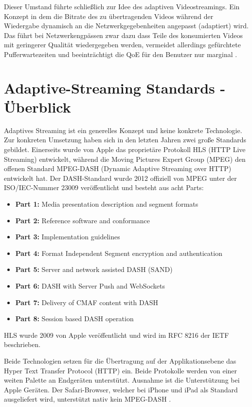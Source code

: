 \documentclass[paper = a4, fontsize = 12pt, parskip = half]{scrartcl} %
\begin{document}
Dieser Umstand führte schließlich zur Idee des adaptiven Videostreamings. Ein Konzept in dem die Bitrate des zu übertragenden Videos während der Wiedergabe dynamisch an die Netzwerkgegebenheiten angepasst (adaptiert) wird. Das führt bei Netzwerkengpässen zwar dazu dass Teile des konsumierten Videos mit geringerer Qualität wiedergegeben werden, vermeidet allerdings gefürchtete Pufferwartezeiten und beeinträchtigt die QoE für den Benutzer nur marginal \cite{seufert_survey_2015}.

\section{Adaptive-Streaming Standards - Überblick}
Adaptives Streaming ist ein generelles Konzept und keine konkrete Technologie. Zur konkreten Umsetzung haben sich in den letzten Jahren zwei große Standards gebildet. Einerseits wurde von Apple das proprietäre Protokoll HLS (HTTP Live Streaming) entwickelt, während die Moving Pictures Expert Group (MPEG) den offenen Standard MPEG-DASH (Dynamic Adaptive Streaming over HTTP) entwickelt hat. Der DASH-Standard wurde 2012 offiziell von MPEG unter der ISO/IEC-Nummer 23009 \cite{international_organization_for_standardization_isoiec_nodate} veröffentlicht und besteht aus acht Parts:

\begin{itemize}
	\item \textbf{Part 1:} Media presentation description and segment formats
	\item \textbf{Part 2:} Reference software and conformance
	\item \textbf{Part 3:} Implementation guidelines
	\item \textbf{Part 4:} Format Independent Segment encryption and authentication
	\item \textbf{Part 5:} Server and network assisted DASH (SAND)
	\item \textbf{Part 6:} DASH with Server Push and WebSockets
	\item \textbf{Part 7:} Delivery of CMAF content with DASH
	\item \textbf{Part 8:} Session based DASH operation
\end{itemize}

HLS wurde 2009 von Apple veröffentlicht und wird im RFC 8216 \cite{pantos_http_nodate} der IETF beschrieben.

Beide Technologien setzen für die Übertragung auf der Applikationsebene das Hyper Text Transfer Protocol (HTTP) ein. Beide Protokolle werden von einer weiten Palette an Endgeräten unterstützt. Ausnahme ist die Unterstützung bei Apple Geräten. Der Safari-Browser, welcher bei iPhone und iPad als Standard ausgeliefert wird, unterstützt nativ kein MPEG-DASH \cite{timmerer_live_2015}.
\end{document}

